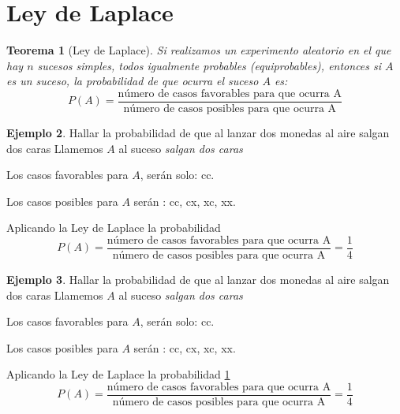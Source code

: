 \documentclass[]{book}
\theoremstyle{plain}
\newtheorem{theorem}{Teorema}[section]
\theoremstyle{definition}
\newtheorem{example}[theorem]{Ejemplo}
\begin{document}
\section{Ley de Laplace}

\begin{theorem}[Ley de Laplace]\label{th_laplace}
  Si realizamos un experimento aleatorio en el que hay $n$ sucesos 
  simples, todos igualmente probables (equiprobables), 
  entonces si $A$ es un suceso, 
  la probabilidad de que ocurra el suceso $A$ es:
  \begin{equation}\label{equ_array}
    P(A) = \frac{\text{número de casos favorables para que ocurra A}}{\text{número de casos posibles para que ocurra A}}
  \end{equation}
\end{theorem}

\begin{example}
  Hallar la probabilidad de que al lanzar dos monedas al aire salgan dos caras
  Llamemos $A$ al suceso \emph{salgan dos caras}
  
  Los casos favorables para $A$, serán solo: cc.

  Los casos posibles para $A$ serán : cc, cx, xc, xx.
  
  Aplicando la Ley de Laplace la probabilidad
  \[     P(A) = \frac{\text{número de casos favorables para que ocurra A}}{\text{número de casos posibles para que ocurra A}} = \frac{1}{4}\]
\end{example}


\begin{example}
  Hallar la probabilidad de que al lanzar dos monedas al aire salgan dos caras
  Llamemos $A$ al suceso \emph{salgan dos caras}
  
  Los casos favorables para $A$, serán solo: cc.

  Los casos posibles para $A$ serán : cc, cx, xc, xx.
  
  Aplicando la Ley de Laplace la probabilidad \ref{th_laplace}
  \[     P(A) = \frac{\text{número de casos favorables para que ocurra A}}{\text{número de casos posibles para que ocurra A}} = \frac{1}{4}\]
\end{example}
\end{document}
